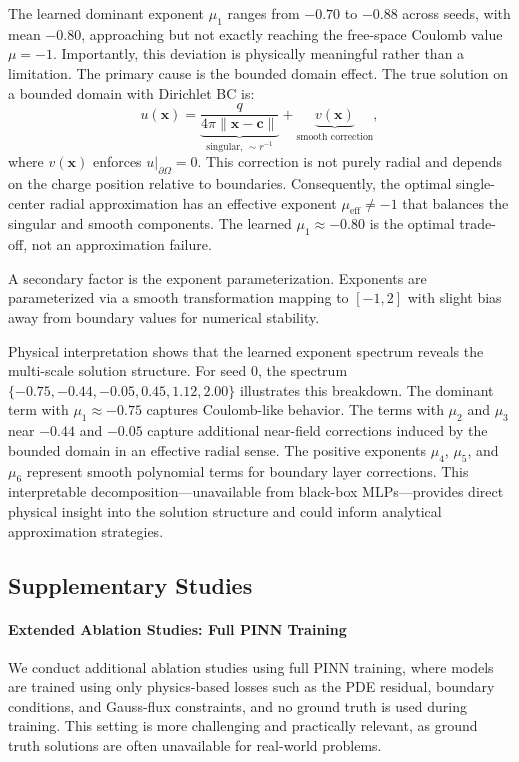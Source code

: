 \documentclass[twoside,11pt]{article}
\newcommand{\bx}{\bm{x}}
\newcommand{\bc}{\bm{c}}
\newcommand{\norm}[1]{\left\|#1\right\|}
\begin{document}
The learned dominant exponent $\mu_1$ ranges from $-0.70$ to $-0.88$ across seeds, with mean $-0.80$, approaching but not exactly reaching the free-space Coulomb value $\mu = -1$. Importantly, this deviation is physically meaningful rather than a limitation. The primary cause is the bounded domain effect. The true solution on a bounded domain with Dirichlet BC is:
\begin{equation}
	u(\bx) = \underbrace{\frac{q}{4\pi\norm{\bx - \bc}}}_{\text{singular, } \sim r^{-1}} + \underbrace{v(\bx)}_{\text{smooth correction}},
\end{equation}
where $v(\bx)$ enforces $u|_{\partial\Omega} = 0$. This correction is not purely radial and depends on the charge position relative to boundaries. Consequently, the optimal single-center radial approximation has an effective exponent $\mu_{\text{eff}} \neq -1$ that balances the singular and smooth components. The learned $\mu_1 \approx -0.80$ is the optimal trade-off, not an approximation failure.

A secondary factor is the exponent parameterization. Exponents are parameterized via a smooth transformation mapping to $[-1, 2]$ with slight bias away from boundary values for numerical stability.

Physical interpretation shows that the learned exponent spectrum reveals the multi-scale solution structure. For seed 0, the spectrum $\{-0.75, -0.44, -0.05, 0.45, 1.12, 2.00\}$ illustrates this breakdown. The dominant term with $\mu_1 \approx -0.75$ captures Coulomb-like behavior. The terms with $\mu_2$ and $\mu_3$ near $-0.44$ and $-0.05$ capture additional near-field corrections induced by the bounded domain in an effective radial sense. The positive exponents $\mu_4$, $\mu_5$, and $\mu_6$ represent smooth polynomial terms for boundary layer corrections. This interpretable decomposition---unavailable from black-box MLPs---provides direct physical insight into the solution structure and could inform analytical approximation strategies.

\subsection{Supplementary Studies}
\label{sec:future_work}

\paragraph{Extended Ablation Studies: Full PINN Training} We conduct additional ablation studies using full PINN training, where models are trained using only physics-based losses such as the PDE residual, boundary conditions, and Gauss-flux constraints, and no ground truth is used during training. This setting is more challenging and practically relevant, as ground truth solutions are often unavailable for real-world problems.
\end{document}
